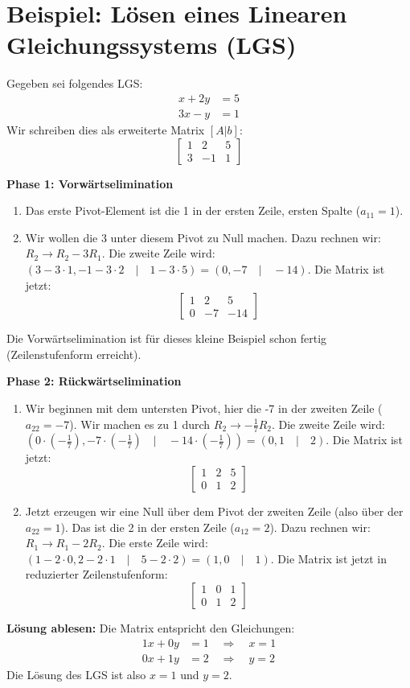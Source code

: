 \section{Beispiel: Lösen eines Linearen Gleichungssystems (LGS)}
Gegeben sei folgendes LGS:
\begin{align*}
x + 2y &= 5 \\
3x - y &= 1
\end{align*}
Wir schreiben dies als erweiterte Matrix $[A|b]$:
$$ \left[ \begin{array}{cc|c}
1 & 2 & 5 \\
3 & -1 & 1
\end{array} \right] $$

\textbf{Phase 1: Vorwärtselimination}
\begin{enumerate}
    \item Das erste Pivot-Element ist die 1 in der ersten Zeile, ersten Spalte ($a_{11}=1$).
    \item Wir wollen die 3 unter diesem Pivot zu Null machen. Dazu rechnen wir: $R_2 \rightarrow R_2 - 3R_1$.
    Die zweite Zeile wird: $(3 - 3 \cdot 1, -1 - 3 \cdot 2 \quad | \quad 1 - 3 \cdot 5) = (0, -7 \quad | \quad -14)$.
    Die Matrix ist jetzt:
    $$ \left[ \begin{array}{cc|c}
    1 & 2 & 5 \\
    0 & -7 & -14
    \end{array} \right] $$
\end{enumerate}
Die Vorwärtselimination ist für dieses kleine Beispiel schon fertig (Zeilenstufenform erreicht).

\textbf{Phase 2: Rückwärtselimination}
\begin{enumerate}
    \item Wir beginnen mit dem untersten Pivot, hier die -7 in der zweiten Zeile ($a_{22}=-7$). Wir machen es zu 1 durch $R_2 \rightarrow -\frac{1}{7}R_2$.
    Die zweite Zeile wird: $(0 \cdot (-\frac{1}{7}), -7 \cdot (-\frac{1}{7}) \quad | \quad -14 \cdot (-\frac{1}{7})) = (0, 1 \quad | \quad 2)$.
    Die Matrix ist jetzt:
    $$ \left[ \begin{array}{cc|c}
    1 & 2 & 5 \\
    0 & 1 & 2
    \end{array} \right] $$
    \item Jetzt erzeugen wir eine Null über dem Pivot der zweiten Zeile (also über der $a_{22}=1$). Das ist die 2 in der ersten Zeile ($a_{12}=2$). Dazu rechnen wir: $R_1 \rightarrow R_1 - 2R_2$.
    Die erste Zeile wird: $(1 - 2 \cdot 0, 2 - 2 \cdot 1 \quad | \quad 5 - 2 \cdot 2) = (1, 0 \quad | \quad 1)$.
    Die Matrix ist jetzt in reduzierter Zeilenstufenform:
    $$ \left[ \begin{array}{cc|c}
    1 & 0 & 1 \\
    0 & 1 & 2
    \end{array} \right] $$
\end{enumerate}

\textbf{Lösung ablesen:}
Die Matrix entspricht den Gleichungen:
\begin{align*}
1x + 0y &= 1 \quad \Rightarrow \quad x = 1 \\
0x + 1y &= 2 \quad \Rightarrow \quad y = 2
\end{align*}
Die Lösung des LGS ist also $x=1$ und $y=2$.